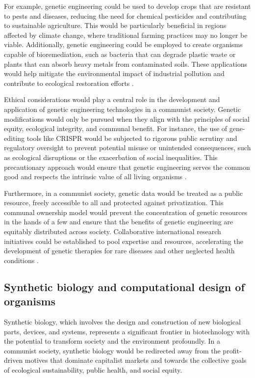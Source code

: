 For example, genetic engineering could be used to develop crops that are resistant to pests and diseases, reducing the need for chemical pesticides and contributing to sustainable agriculture. This would be particularly beneficial in regions affected by climate change, where traditional farming practices may no longer be viable. Additionally, genetic engineering could be employed to create organisms capable of bioremediation, such as bacteria that can degrade plastic waste or plants that can absorb heavy metals from contaminated soils. These applications would help mitigate the environmental impact of industrial pollution and contribute to ecological restoration efforts \cite[pp.~45-50]{patel2017biotechnology}.

Ethical considerations would play a central role in the development and application of genetic engineering technologies in a communist society. Genetic modifications would only be pursued when they align with the principles of social equity, ecological integrity, and communal benefit. For instance, the use of gene-editing tools like CRISPR would be subjected to rigorous public scrutiny and regulatory oversight to prevent potential misuse or unintended consequences, such as ecological disruptions or the exacerbation of social inequalities. This precautionary approach would ensure that genetic engineering serves the common good and respects the intrinsic value of all living organisms \cite[pp.~110-115]{garcia2019genetics}.

Furthermore, in a communist society, genetic data would be treated as a public resource, freely accessible to all and protected against privatization. This communal ownership model would prevent the concentration of genetic resources in the hands of a few and ensure that the benefits of genetic engineering are equitably distributed across society. Collaborative international research initiatives could be established to pool expertise and resources, accelerating the development of genetic therapies for rare diseases and other neglected health conditions \cite[pp.~78-82]{davis2018ethics}.

\subsection{Synthetic biology and computational design of organisms}

Synthetic biology, which involves the design and construction of new biological parts, devices, and systems, represents a significant frontier in biotechnology with the potential to transform society and the environment profoundly. In a communist society, synthetic biology would be redirected away from the profit-driven motives that dominate capitalist markets and towards the collective goals of ecological sustainability, public health, and social equity.

